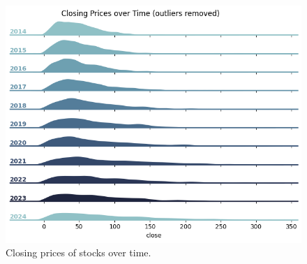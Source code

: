 \documentclass[conference]{IEEEtran}
\begin{document}
\begin{figure}
    \centering
    \includegraphics[width=\columnwidth]{figures/closeOverTime.png}
    \caption{Closing prices of stocks over time.}
    \label{figure:closeOverTime}
\end{figure}
\end{document}
